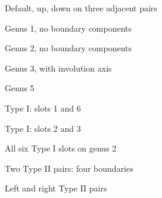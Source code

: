 \documentclass{article}
\begin{document}
\clearpage
\begin{center}
\Large Default, up, down on three adjacent pairs\par\bigskip
{}
\end{center}
\clearpage
\begin{center}
\Large Genus 1, no boundary components\par\bigskip
{}
\end{center}
\clearpage
\begin{center}
\Large Genus 2, no boundary components\par\bigskip
{}
\end{center}
\clearpage
\begin{center}
\Large Genus 3, with involution axis\par\bigskip
{}
\end{center}
\clearpage
\begin{center}
\Large Genus 5\par\bigskip
{}
\end{center}
\clearpage
\begin{center}
\Large Type I: slots 1 and 6\par\bigskip
{}
\end{center}
\clearpage
\begin{center}
\Large Type I: slots 2 and 3\par\bigskip
{}
\end{center}
\clearpage
\begin{center}
\Large All six Type I slots on genus 2\par\bigskip
{}
\end{center}
\clearpage
\begin{center}
\Large Two Type II pairs: four boundaries\par\bigskip
{}
\end{center}
\clearpage
\begin{center}
\Large Left and right Type II pairs\par\bigskip
{}
\end{center}
\end{document}
